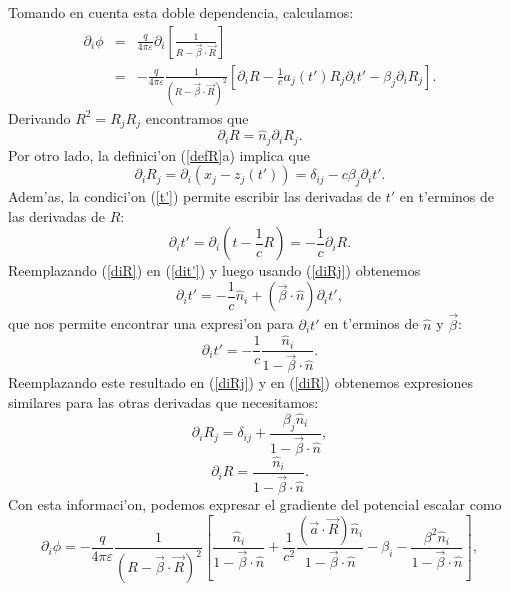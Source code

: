 Tomando en cuenta esta doble dependencia, calculamos:
\begin{eqnarray}
 \partial_i\phi&=&\frac{q}{4\pi\varepsilon}\partial_i\left[\frac{1}{R-\vec{\beta}\cdot\vec{R}}\right] \\
&=&-\frac{q}{4\pi\varepsilon}\frac{1}{(R-\vec{\beta}\cdot\vec{R})^2}\left[\partial_iR-\frac{1}{c}a_j(t')R_j\partial_i t'-\beta_j\partial_iR_j\right].
\end{eqnarray}
Derivando $R^2=R_jR_j$ encontramos que
\begin{equation}
\partial_i R=\hat{n}_j\partial_i R_j. \label{diR}
\end{equation}
Por otro lado, la definici'on (\ref{defR}a) implica que
\begin{equation}
 \partial_i R_j=\partial_i( x_j-z_j(t'))=\delta_{ij}-c\beta_j\partial_i t' . \label{diRj}
\end{equation}
Adem'as, la condici'on (\ref{t'}) permite escribir las derivadas de $t'$ en t'erminos de las derivadas de $R$:
\begin{equation}
 \partial_i t'=\partial_i(t-\frac{1}{c}R)=-\frac{1}{c}\partial_iR. \label{dit'}
\end{equation}
Reemplazando (\ref{diR}) en (\ref{dit'})  y luego usando (\ref{diRj}) obtenemos
\begin{equation}
 \partial_i t'=-\frac{1}{c}\hat{n}_i+(\vec{\beta}\cdot\hat{n})\partial_it', \label{dit'2}
\end{equation}
que nos permite encontrar una expresi'on para $\partial_it'$ en t'erminos de $\hat{n}$ y $\vec{\beta}$:
\begin{equation}
 \boxed{\partial_i t'=-\frac{1}{c}\frac{\hat{n}_i}{1-\vec{\beta}\cdot\hat{n}}.}
\end{equation}
Reemplazando este resultado en (\ref{diRj}) y en (\ref{diR}) obtenemos expresiones similares para las otras derivadas que necesitamos:
\begin{equation}
 \boxed{\partial_i R_j=\delta_{ij}+\frac{\beta_j\hat{n}_i}{1-\vec{\beta}\cdot\hat{n}},}
\end{equation}
\begin{equation}
\boxed{\partial_i R=\frac{\hat{n}_i}{1-\vec{\beta}\cdot\hat{n}}.}
\end{equation}
Con esta informaci'on, podemos expresar el gradiente del potencial escalar como
\begin{equation}
 \partial_i\phi=-\frac{q}{4\pi\varepsilon}\frac{1}{(R-\vec{\beta}\cdot\vec{R})^2} \left[\frac{\hat{n}_i}{1-\vec{\beta}\cdot\hat{n}}+\frac{1}{c^2}\frac{(\vec{a}\cdot\vec{R})\hat{n}_i}{1-\vec{\beta}\cdot\hat{n}} -\beta_i-\frac{\beta^2\hat{n}_i}{1-\vec{\beta}\cdot\hat{n}}\right],
\end{equation}
